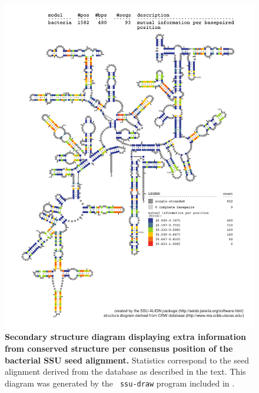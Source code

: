 \begin{figure}
\begin{center}
\includegraphics[width=5.7in]{Figures/bacteria-0p1-mutinfo}
\end{center}
\caption[Secondary structure diagram displaying extra information 
  from conserved structure per consensus position of the bacterial SSU seed
  alignment]{\textbf{Secondary structure diagram displaying extra
  information from conserved structure per consensus position of the bacterial SSU seed
  alignment.} Statistics correspond to the  seed
  alignment derived from the  database \cite{CannoneGutell02}
  as described in the text. This diagram was generated by the {\tt
  ssu-draw} program included in .}
\label{fig:bacsinfo}
\end{figure}


